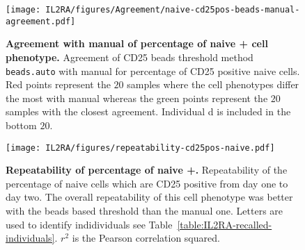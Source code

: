\begin{figure}[h]
\centering
\texttt{[image: IL2RA/figures/Agreement/naive-cd25pos-beads-manual-agreement.pdf]}
\caption{ 
\label{figure:threshold-manual-agreement}
\textbf{Agreement with manual of percentage of naive + cell phenotype.}
Agreement of CD25 beads threshold method \texttt{beads.auto} with manual for percentage of CD25 positive naive cells.
Red points represent the $20$ samples where the cell phenotypes differ the most with manual 
whereas the green points represent the $20$ samples with the closest agreement.
Individual d is included in the bottom $20$.
}
\end{figure}


\begin{figure}[h]
\centering
\texttt{[image: IL2RA/figures/repeatability-cd25pos-naive.pdf]}
\caption{
\label{figure:repeatability-cd25pos-naive}
\textbf{Repeatability of percentage of naive +.}
Repeatability of the percentage of naive cells which are CD25 positive from day one to day two.
The overall repeatability of this cell phenotype was better with the beads based threshold than the manual one.
Letters are used to identify indidividuals see Table~\ref{table:IL2RA-recalled-individuals}.
$r^2$ is the Pearson correlation squared.
}
\end{figure}


